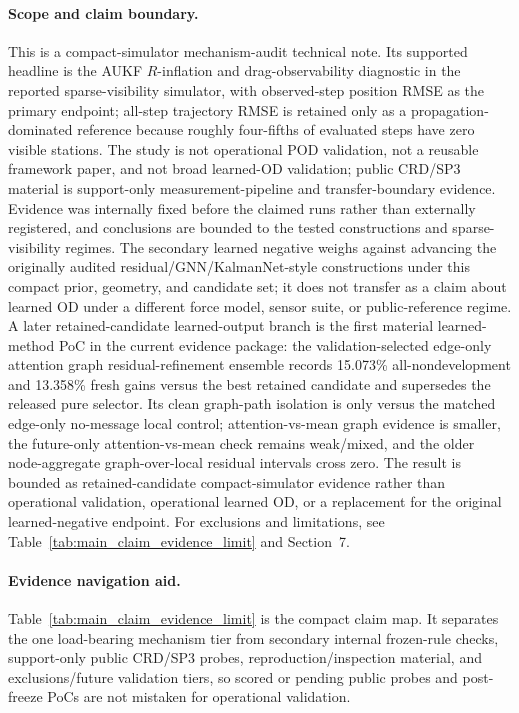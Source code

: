\documentclass{article}
\begin{document}
\paragraph{Scope and claim boundary.}
This is a compact-simulator mechanism-audit technical note. Its supported headline is the AUKF \(R\)-inflation and drag-observability diagnostic in the reported sparse-visibility simulator, with observed-step position RMSE as the primary endpoint; all-step trajectory RMSE is retained only as a propagation-dominated reference because roughly four-fifths of evaluated steps have zero visible stations. The study is not operational POD validation, not a reusable framework paper, and not broad learned-OD validation; public CRD/SP3 material is support-only measurement-pipeline and transfer-boundary evidence. Evidence was internally fixed before the claimed runs rather than externally registered, and conclusions are bounded to the tested constructions and sparse-visibility regimes. The secondary learned negative weighs against advancing the originally audited residual/GNN/KalmanNet-style constructions under this compact prior, geometry, and candidate set; it does not transfer as a claim about learned OD under a different force model, sensor suite, or public-reference regime. A later retained-candidate learned-output branch is the first material learned-method PoC in the current evidence package: the validation-selected edge-only attention graph residual-refinement ensemble records 15.073\% all-nondevelopment and 13.358\% fresh gains versus the best retained candidate and supersedes the released pure selector. Its clean graph-path isolation is only versus the matched edge-only no-message local control; attention-vs-mean graph evidence is smaller, the future-only attention-vs-mean check remains weak/mixed, and the older node-aggregate graph-over-local residual intervals cross zero. The result is bounded as retained-candidate compact-simulator evidence rather than operational validation, operational learned OD, or a replacement for the original learned-negative endpoint. For exclusions and limitations, see Table~\ref{tab:main_claim_evidence_limit} and Section~7.

\paragraph{Evidence navigation aid.}
Table~\ref{tab:main_claim_evidence_limit} is the compact claim map. It separates the one load-bearing mechanism tier from secondary internal frozen-rule checks, support-only public CRD/SP3 probes, reproduction/inspection material, and exclusions/future validation tiers, so scored or pending public probes and post-freeze PoCs are not mistaken for operational validation.
\end{document}

